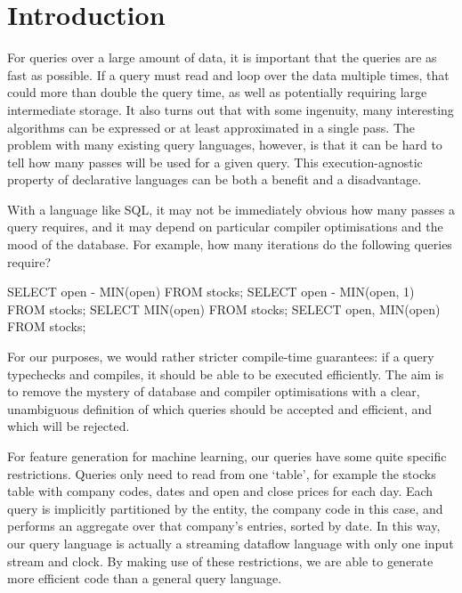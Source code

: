 \section{Introduction}
\label{s:Introduction}

For queries over a large amount of data, it is important that the queries are as fast as possible.
If a query must read and loop over the data multiple times, that could more than double the query time, as well as potentially requiring large intermediate storage.
It also turns out that with some ingenuity, many interesting algorithms can be expressed or at least approximated in a single pass.
The problem with many existing query languages, however, is that it can be hard to tell how many passes will be used for a given query.
This execution-agnostic property of declarative languages can be both a benefit and a disadvantage.

With a language like SQL, it may not be immediately obvious how many passes a query requires, and it may depend on particular compiler optimisations and the mood of the database.
For example, how many iterations do the following queries require?

\begin{code}
SELECT open - MIN(open)    FROM stocks;
SELECT open - MIN(open, 1) FROM stocks;
SELECT        MIN(open)    FROM stocks;
SELECT open,  MIN(open)    FROM stocks;
\end{code}

For our purposes, we would rather stricter compile-time guarantees: if a query typechecks and compiles, it should be able to be executed efficiently.
The aim is to remove the mystery of database and compiler optimisations with a clear, unambiguous definition of which queries should be accepted and efficient, and which will be rejected.

For feature generation for machine learning, our queries have some quite specific restrictions.
Queries only need to read from one `table', for example the stocks table with company codes, dates and open and close prices for each day.
Each query is implicitly partitioned by the entity, the company code in this case, and performs an aggregate over that company's entries, sorted by date.
In this way, our query language is actually a streaming dataflow language with only one input stream and clock.
By making use of these restrictions, we are able to generate more efficient code than a general query language.


